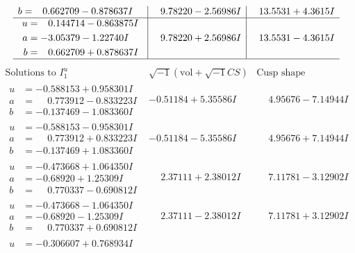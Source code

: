\documentclass[1p]{elsarticle_modified}
\theoremstyle{definition}
\newcommand{\I}{\sqrt{-1}}
\begin{document}
$$\begin{array}{c|c|c}
\begin{aligned}
b &= \phantom{-}0.662709 - 0.878637 I\end{aligned}
 & \phantom{-}9.78220 - 2.56986 I & \phantom{-}13.5531 + 4.3615 I \\ \hline\begin{aligned}
u &= \phantom{-}0.144714 - 0.863875 I \\
a &= -3.05379 - 1.22740 I \\
b &= \phantom{-}0.662709 + 0.878637 I\end{aligned}
 & \phantom{-}9.78220 + 2.56986 I & \phantom{-}13.5531 - 4.3615 I\\
 \hline 
 \end{array}$$\newpage$$\begin{array}{c|c|c}  
\text{Solutions to }I^u_{1}& \I (\text{vol} + \sqrt{-1}CS) & \text{Cusp shape}\\
 \hline 
\begin{aligned}
u &= -0.588153 + 0.958301 I \\
a &= \phantom{-}0.773912 - 0.833223 I \\
b &= -0.137469 - 1.083360 I\end{aligned}
 & -0.51184 + 5.35586 I & \phantom{-}4.95676 - 7.14944 I \\ \hline\begin{aligned}
u &= -0.588153 - 0.958301 I \\
a &= \phantom{-}0.773912 + 0.833223 I \\
b &= -0.137469 + 1.083360 I\end{aligned}
 & -0.51184 - 5.35586 I & \phantom{-}4.95676 + 7.14944 I \\ \hline\begin{aligned}
u &= -0.473668 + 1.064350 I \\
a &= -0.68920 + 1.25309 I \\
b &= \phantom{-}0.770337 - 0.690812 I\end{aligned}
 & \phantom{-}2.37111 + 2.38012 I & \phantom{-}7.11781 - 3.12902 I \\ \hline\begin{aligned}
u &= -0.473668 - 1.064350 I \\
a &= -0.68920 - 1.25309 I \\
b &= \phantom{-}0.770337 + 0.690812 I\end{aligned}
 & \phantom{-}2.37111 - 2.38012 I & \phantom{-}7.11781 + 3.12902 I \\ \hline\begin{aligned}
u &= -0.306607 + 0.768934 I \\

\end{aligned}
\end{array}$$
\end{document}
